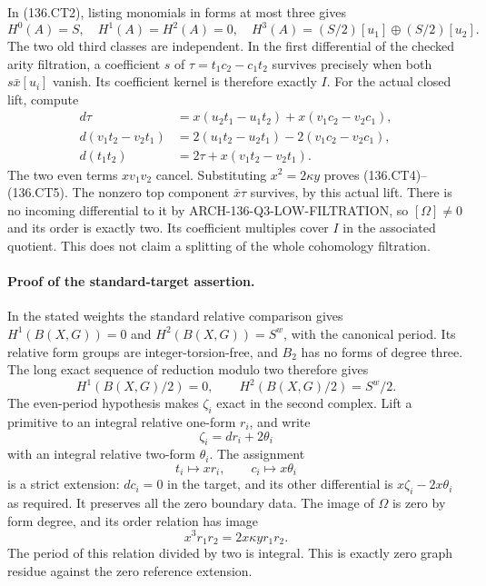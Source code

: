 In (136.CT2), listing monomials in forms at most three gives
\[
 H^0(A)=S,\quad H^1(A)=H^2(A)=0,\quad
 H^3(A)=(S/2)[u_1]\oplus(S/2)[u_2].
 \tag{136.CT8}
\]
The two old third classes are independent.  In the first
differential of the checked arity filtration, a coefficient
$s$ of $\tau=t_1c_2-c_1t_2$ survives precisely when both
$s\bar x[u_i]$ vanish.  Its coefficient kernel is therefore
exactly $I$.
For the actual closed lift, compute
\[
 \begin{aligned}
 d\tau&=x(u_2t_1-u_1t_2)+x(v_1c_2-v_2c_1),\\
 d(v_1t_2-v_2t_1)
       &=2(u_1t_2-u_2t_1)-2(v_1c_2-v_2c_1),\\
 d(t_1t_2)&=2\tau+x(v_1t_2-v_2t_1).
 \end{aligned}
 \tag{136.CT9}
\]
The two even terms $xv_1v_2$ cancel.  Substituting
$x^2=2\kappa y$ proves (136.CT4)--(136.CT5).
The nonzero top component $\bar x\tau$ survives, by this
actual lift.  There is no incoming differential to it by
ARCH-136-Q3-LOW-FILTRATION, so $[\Omega]\ne0$ and its
order is exactly two.  Its coefficient multiples cover
$I$ in the associated quotient.  This does not claim a
splitting of the whole cohomology filtration.

\paragraph{Proof of the standard-target assertion.}
In the stated weights the standard relative comparison gives
$H^1(B(X,G))=0$ and $H^2(B(X,G))=S^w$, with the canonical
period.  Its relative form groups are integer-torsion-free,
and $B_2$ has no forms of degree three.  The long exact
sequence of reduction modulo two therefore gives
\[
 H^1(B(X,G)/2)=0,\qquad H^2(B(X,G)/2)=S^w/2.
 \tag{136.CT10}
\]
The even-period hypothesis makes $\zeta_i$ exact in the
second complex.  Lift a primitive to an integral relative
one-form $r_i$, and write
\[
                   \zeta_i=dr_i+2\theta_i
 \tag{136.CT11}
\]
with an integral relative two-form $\theta_i$.
The assignment
\[
                       t_i\longmapsto xr_i,
                \qquad c_i\longmapsto x\theta_i
 \tag{136.CT12}
\]
is a strict extension: $dc_i=0$ in the target, and its other
differential is $x\zeta_i-2x\theta_i$ as required.
It preserves all the zero boundary data.  The image of
$\Omega$ is zero by form degree, and its order relation has
image
\[
               x^3r_1r_2=2x\kappa y r_1r_2.
 \tag{136.CT13}
\]
The period of this relation divided by two is integral.
This is exactly zero graph residue against the zero
reference extension.

